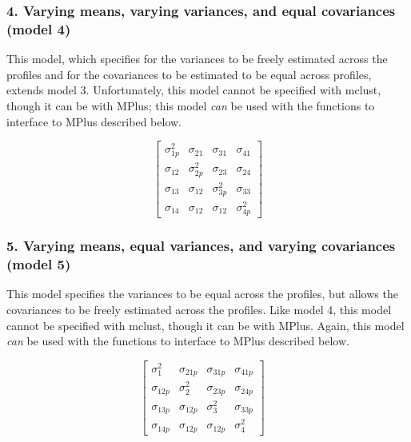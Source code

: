 \documentclass[]{msu-thesis}
\theoremstyle{definition}
\theoremstyle{definition}
\theoremstyle{definition}
\theoremstyle{remark}
\begin{document}
\subsubsection{4. Varying means, varying variances, and equal
covariances (model
4)}\label{varying-means-varying-variances-and-equal-covariances-model-4}

This model, which specifies for the variances to be freely estimated
across the profiles and for the covariances to be estimated to be equal
across profiles, extends model 3. Unfortunately, this model cannot be
specified with mclust, though it can be with MPlus; this model
\emph{can} be used with the functions to interface to MPlus described
below.

\[
\left[ \begin{matrix} { \sigma  }_{ 1p }^{ 2 } & { \sigma  }_{ 21 } & { \sigma  }_{ 31 } & { \sigma  }_{ 41 } \\ { \sigma  }_{ 12 } & { \sigma  }_{ 2p }^{ 2 } & { \sigma  }_{ 23 } & { \sigma  }_{ 24 } \\ { \sigma  }_{ 13 } & { \sigma  }_{ 12 } & { \sigma  }_{ 3p }^{ 2 } & { \sigma  }_{ 33 } \\ { \sigma  }_{ 14 } & { \sigma  }_{ 12 } & { \sigma  }_{ 12 } & { \sigma  }_{ 4p }^{ 2 } \end{matrix} \right] 
\]

\subsubsection{5. Varying means, equal variances, and varying
covariances (model
5)}\label{varying-means-equal-variances-and-varying-covariances-model-5}

This model specifies the variances to be equal across the profiles, but
allows the covariances to be freely estimated across the profiles. Like
model 4, this model cannot be specified with mclust, though it can be
with MPlus. Again, this model \emph{can} be used with the functions to
interface to MPlus described below.

\[
\left[ \begin{matrix} { \sigma  }_{ 1 }^{ 2 } & { \sigma  }_{ 21p } & { \sigma  }_{ 31p } & { \sigma  }_{ 41p } \\ { \sigma  }_{ 12p } & { \sigma  }_{ 2 }^{ 2 } & { \sigma  }_{ 23p } & { \sigma  }_{ 24p } \\ { \sigma  }_{ 13p } & { \sigma  }_{ 12p } & { \sigma  }_{ 3 }^{ 2 } & { \sigma  }_{ 33p } \\ { \sigma  }_{ 14p } & { \sigma  }_{ 12p } & { \sigma  }_{ 12p } & { \sigma  }_{ 4 }^{ 2 } \end{matrix} \right] \quad 
\]
\end{document}
